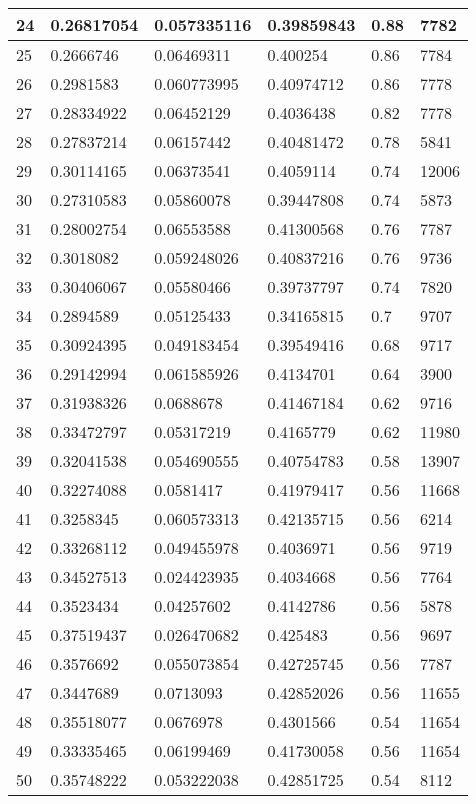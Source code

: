 \begin{longtable}{|l|l|l|l|l|l|}
24 & 0.26817054 & 0.057335116 & 0.39859843 & 0.88 & 7782 \\ \hline 
25 & 0.2666746 & 0.06469311 & 0.400254 & 0.86 & 7784 \\ \hline 
26 & 0.2981583 & 0.060773995 & 0.40974712 & 0.86 & 7778 \\ \hline 
27 & 0.28334922 & 0.06452129 & 0.4036438 & 0.82 & 7778 \\ \hline 
28 & 0.27837214 & 0.06157442 & 0.40481472 & 0.78 & 5841 \\ \hline 
29 & 0.30114165 & 0.06373541 & 0.4059114 & 0.74 & 12006 \\ \hline 
30 & 0.27310583 & 0.05860078 & 0.39447808 & 0.74 & 5873 \\ \hline 
31 & 0.28002754 & 0.06553588 & 0.41300568 & 0.76 & 7787 \\ \hline 
32 & 0.3018082 & 0.059248026 & 0.40837216 & 0.76 & 9736 \\ \hline 
33 & 0.30406067 & 0.05580466 & 0.39737797 & 0.74 & 7820 \\ \hline 
34 & 0.2894589 & 0.05125433 & 0.34165815 & 0.7 & 9707 \\ \hline 
35 & 0.30924395 & 0.049183454 & 0.39549416 & 0.68 & 9717 \\ \hline 
36 & 0.29142994 & 0.061585926 & 0.4134701 & 0.64 & 3900 \\ \hline 
37 & 0.31938326 & 0.0688678 & 0.41467184 & 0.62 & 9716 \\ \hline 
38 & 0.33472797 & 0.05317219 & 0.4165779 & 0.62 & 11980 \\ \hline 
39 & 0.32041538 & 0.054690555 & 0.40754783 & 0.58 & 13907 \\ \hline 
40 & 0.32274088 & 0.0581417 & 0.41979417 & 0.56 & 11668 \\ \hline 
41 & 0.3258345 & 0.060573313 & 0.42135715 & 0.56 & 6214 \\ \hline 
42 & 0.33268112 & 0.049455978 & 0.4036971 & 0.56 & 9719 \\ \hline 
43 & 0.34527513 & 0.024423935 & 0.4034668 & 0.56 & 7764 \\ \hline 
44 & 0.3523434 & 0.04257602 & 0.4142786 & 0.56 & 5878 \\ \hline 
45 & 0.37519437 & 0.026470682 & 0.425483 & 0.56 & 9697 \\ \hline 
46 & 0.3576692 & 0.055073854 & 0.42725745 & 0.56 & 7787 \\ \hline 
47 & 0.3447689 & 0.0713093 & 0.42852026 & 0.56 & 11655 \\ \hline 
48 & 0.35518077 & 0.0676978 & 0.4301566 & 0.54 & 11654 \\ \hline 
49 & 0.33335465 & 0.06199469 & 0.41730058 & 0.56 & 11654 \\ \hline 
50 & 0.35748222 & 0.053222038 & 0.42851725 & 0.54 & 8112 \\ \hline 
\end{longtable}